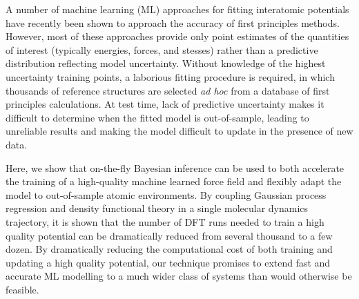 \documentclass[%
reprint,
superscriptaddress,
amsmath,amssymb,
aps,
prl,
]{revtex4-1}
\begin{document}
A number of machine learning (ML) approaches for fitting interatomic potentials have recently been shown to approach the accuracy of first principles methods. However, most of these approaches provide only point estimates of the quantities of interest (typically energies, forces, and stesses) rather than a predictive distribution reflecting model uncertainty. Without knowledge of the highest uncertainty training points, a laborious fitting procedure is required, in which thousands of reference structures are selected \textit{ad hoc} from a database of first principles calculations. At test time, lack of predictive uncertainty makes it difficult to determine when the fitted model is out-of-sample, leading to unreliable results and making the model difficult to update in the presence of new data.

Here, we show that on-the-fly Bayesian inference can be used to both accelerate the training of a high-quality machine learned force field and flexibly adapt the model to out-of-sample atomic environments. By coupling Gaussian process regression and density functional theory in a single molecular dynamics trajectory, it is shown that the number of DFT runs needed to train a high quality potential can be dramatically reduced from several thousand to a few dozen. By dramatically reducing the computational cost of both training and updating a high quality potential, our technique promises to extend fast and accurate ML modelling to a much wider class of systems than would otherwise be feasible.






\end{document}

